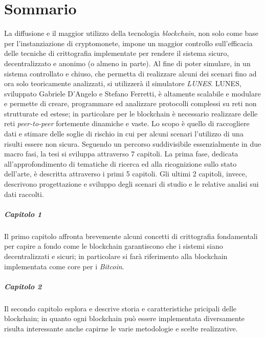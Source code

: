 \chapter{Sommario}
La diffusione e il maggior utilizzo della tecnologia \textit{blockchain}, non solo come base per l'instanziazione di cryptomonete, impone un maggior controllo sull'efficacia delle tecniche di crittografia implementate per rendere il sistema sicuro, decentralizzato e anonimo (o almeno in parte).
Al fine di poter simulare, in un sistema controllato e chiuso, che permetta di realizzare alcuni dei scenari fino ad ora solo teoricamente analizzati, si utilizzerà il simulatore \textit{LUNES}\cite{gdalunes}.\newline
LUNES, sviluppato Gabriele D'Angelo e Stefano Ferretti, è altamente scalabile e modulare e permette di creare, programmare ed analizzare protocolli complessi su reti non strutturate ed estese; in particolare per le blockchain è necessario realizzare delle reti \textit{peer-to-peer} fortemente dinamiche e vaste.\newline
Lo scopo è quello di raccogliere dati e stimare delle soglie di rischio in cui per alcuni scenari l'utilizzo di una  risulti essere non sicura.\newline\newline
Seguendo un percorso suddivisibile essenzialmente in due macro fasi, la tesi si sviluppa attraverso 7 capitoli. La prima fase, dedicata all'approfondimento di tematiche di ricerca ed alla ricognizione sullo stato dell'arte, è descritta attraverso i primi 5 capitoli. Gli ultimi 2 capitoli, invece, descrivono progettazione e sviluppo degli scenari di studio e le relative analisi sui dati raccolti.

\paragraph{Capitolo 1}
Il primo capitolo affronta brevemente alcuni concetti di crittografia fondamentali per capire a fondo come le blockchain garantiscono che i sistemi siano decentralizzati e sicuri; in particolare si farà riferimento alla blockchain implementata come core per i \textit{Bitcoin}.

\paragraph{Capitolo 2}
Il secondo capitolo esplora e descrive storia e caratteristiche pricipali delle blockchain; in quanto ogni blockchain può essere implementata diversamente risulta interessante anche capirne le varie metodologie e scelte realizzative.

